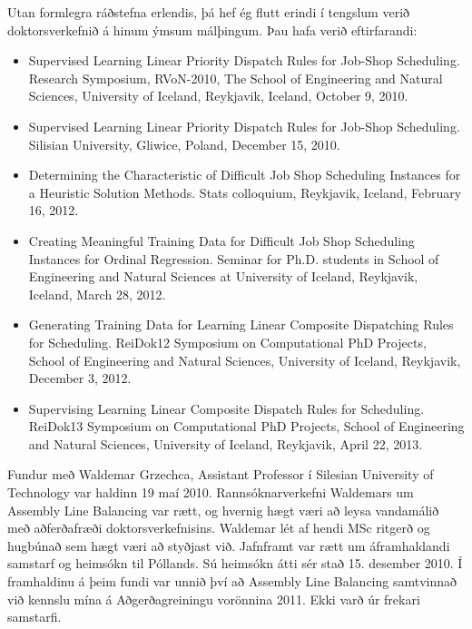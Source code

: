 \documentclass{cover}
\begin{document}
{Utan formlegra ráðstefna erlendis, þá hef ég flutt erindi í tengslum verið 
doktorsverkefnið á hinum ýmsum málþingum. 
Þau hafa verið eftirfarandi:

\begin{itemize}
\item Supervised Learning Linear Priority Dispatch Rules for Job-Shop 
Scheduling. Research Symposium, RVoN-2010, The School of Engineering and 
Natural Sciences, University of Iceland, Reykjavik, Iceland, October 9, 2010.

\item Supervised Learning Linear Priority Dispatch Rules for Job-Shop 
Scheduling. Silisian University, Gliwice, Poland, December 15, 2010.

\item Determining the Characteristic of Difficult Job Shop Scheduling Instances 
for a Heuristic Solution Methods. Stats colloquium, Reykjavik, Iceland, 
February 16, 2012. 

\item Creating Meaningful Training Data for Difficult Job Shop Scheduling 
Instances for Ordinal Regression. Seminar for Ph.D. students in School of 
Engineering and Natural Sciences at University of Iceland, Reykjavik, Iceland, 
March 28, 2012.

\item Generating Training Data for Learning Linear Composite Dispatching Rules 
for Scheduling. ReiDok12 Symposium on Computational PhD Projects, School of 
Engineering and Natural Sciences, University of Iceland, Reykjavik, December 3, 
2012. 

\item Supervising Learning Linear Composite Dispatch Rules for Scheduling. 
ReiDok13 Symposium on Computational PhD Projects, School of Engineering and 
Natural Sciences, University of Iceland, Reykjavik, April 22, 2013. 

\end{itemize}

Fundur með Waldemar Grzechca, Assistant Professor í Silesian University
of Technology var haldinn 19 maí 2010. Rannsóknarverkefni Waldemars um Assembly 
Line Balancing var rætt, og hvernig hægt væri að leysa vandamálið
með aðferðafræði doktorsverkefnisins. 
Waldemar lét af hendi MSc ritgerð og hugbúnað sem hægt væri að styðjast við. 
Jafnframt var rætt um áframhaldandi samstarf og heimsókn til Póllands. 
Sú heimsókn átti sér stað 15. desember 2010. 
Í framhaldinu á þeim fundi var unnið því að Assembly Line Balancing samtvinnað 
við kennslu mína á Aðgerðagreiningu vorönnina 2011.
Ekki varð úr frekari samstarfi. 

}
\end{document}

